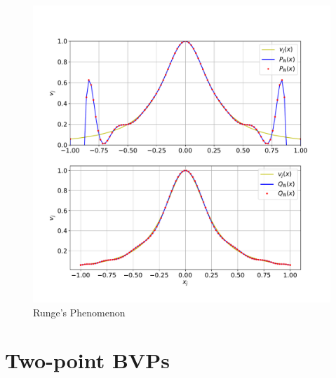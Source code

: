 \documentclass[11pt]{article}
\begin{document}
\begin{figure}[!ht]
  \centering
  \includegraphics[width=1\textwidth]{Runge_Phenomenon.pdf}
  \caption{Runge's Phenomenon}
\end{figure}
\pagebreak











\section{Two-point BVPs}
\end{document}
